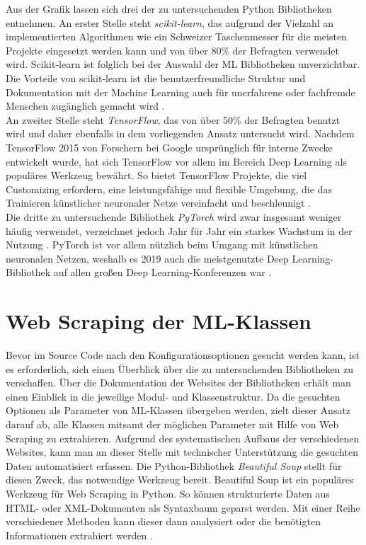 \documentclass[german,bachelor]{swsLeipzig}
\begin{document}
\noindent Aus der Grafik lassen sich drei der zu untersuchenden Python Bibliotheken entnehmen.
An erster Stelle steht \textit{scikit-learn}, das aufgrund der Vielzahl an implementierten Algorithmen wie ein \glqq Schweizer Taschenmesser\grqq{}
für die meisten Projekte eingesetzt werden kann und von über 80\% der Befragten verwendet wird.
Scikit-learn ist folglich bei der Auswahl der ML Bibliotheken unverzichtbar.
Die Vorteile von scikit-learn ist die benutzerfreundliche Struktur und Dokumentation mit der Machine Learning
auch für unerfahrene oder fachfremde Menschen zugänglich gemacht wird \cite[]{10.1145/2786984.2786995}.\\
\indent An zweiter Stelle steht \textit{TensorFlow}, das von über 50\% der Befragten benutzt wird und daher ebenfalls in
dem vorliegenden Ansatz untersucht wird.
Nachdem TensorFlow 2015 von Forschern bei Google ursprünglich für interne Zwecke entwickelt wurde, hat sich TensorFlow vor allem im Bereich
Deep Learning als populäres Werkzeug bewährt.
So bietet TensorFlow Projekte, die viel Customizing erfordern, eine leistungsfähige und flexible Umgebung, die das Trainieren
künstlicher neuronaler Netze vereinfacht und beschleunigt \cite[]{doi:10.3102/1076998619872761}.\\
\indent Die dritte zu untersuchende Bibliothek \textit{PyTorch} wird zwar insgesamt weniger häufig verwendet, verzeichnet
jedoch Jahr für Jahr ein starkes Wachstum in der Nutzung \cite[]{kaggle}.
PyTorch ist vor allem nützlich beim Umgang mit künstlichen neuronalen Netzen, weshalb es 2019 auch die
meistgenutzte Deep Learning-Bibliothek auf allen großen Deep Learning-Konferenzen war \cite[]{2020}.\\

\section{Web Scraping der ML-Klassen}\label{scrape}
Bevor im Source Code nach den Konfigurationsoptionen gesucht werden kann, ist es erforderlich, sich einen Überblick über
die zu untersuchenden Bibliotheken zu verschaffen.
Über die Dokumentation der Websites der Bibliotheken erhält man einen Einblick in die jeweilige Modul- und Klassenstruktur.
Da die gesuchten Optionen als Parameter von ML-Klassen übergeben werden, zielt dieser Ansatz darauf ab, alle Klassen
mitsamt der möglichen Parameter mit Hilfe von Web Scraping zu extrahieren.
Aufgrund des systematischen Aufbaus der verschiedenen Websites, kann man an dieser Stelle mit technischer Unterstützung
die gesuchten Daten automatisiert erfassen.
Die Python-Bibliothek \textit{Beautiful Soup} stellt für diesen Zweck, das notwendige Werkzeug bereit.
Beautiful Soup ist ein populäres Werkzeug für Web Scraping in Python.
So können strukturierte Daten aus HTML- oder XML-Dokumenten als Syntaxbaum geparst werden.
Mit einer Reihe verschiedener Methoden kann dieser dann analysiert oder die benötigten Informationen
extrahiert werden \cite[]{richardson2007beautiful}.\\
\end{document}
